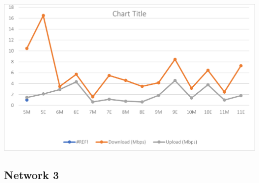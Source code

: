 \documentclass{article}
\begin{document}
\includegraphics{anijio.png}
\pagebreak
\subsection{Network 3}
\end{document}
